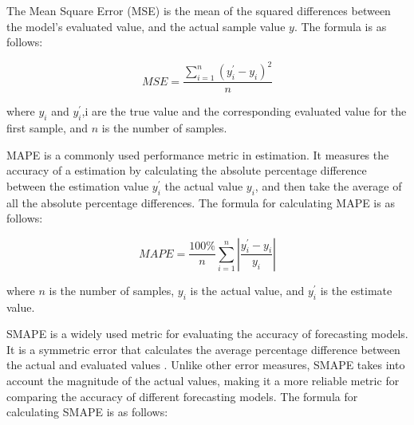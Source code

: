 \documentclass[acmsmall,manuscript, screen, review]{acmart}
\begin{document}
The Mean Square Error (MSE) is the mean of the squared differences between the model's evaluated value, and the actual sample value \begin{math}
  y
\end{math}. The formula is as follows:

\begin{equation}
  MSE=\frac{\sum_{i=1}^{n}\left(y_i^\prime-y_i\right)^2}{n} \label{mse}
\end{equation}

where \begin{math}
  y_i
\end{math} and \begin{math}
  y_i^\prime
\end{math},i are the true value and the corresponding evaluated value for the first sample, and \begin{math}
  n
\end{math} is the number of samples.

MAPE is a commonly used performance metric in estimation. It measures the accuracy of a estimation by calculating the absolute percentage difference between the estimation value \begin{math}
  y_i^\prime
\end{math} the actual value \begin{math}
  y_i
\end{math}, and then take the average of all the absolute percentage differences. The formula for calculating MAPE is as follows:

\begin{equation}
  MAPE=\frac{100\%}{n}\sum_{i=1}^{n}\left|\frac{y_i^\prime-y_i}{y_i}\right| \label{mape}
\end{equation}

where \begin{math}
  n
\end{math} is the number of samples, \begin{math}
  y_i
\end{math} is the actual value, and \begin{math}
  y_i^\prime
\end{math} is the estimate value.

SMAPE is a widely used metric for evaluating the accuracy of forecasting models. It is a symmetric error that calculates the average percentage difference between the actual and evaluated values . Unlike other error measures, SMAPE takes into account the magnitude of the actual values, making it a more reliable metric for comparing the accuracy of different forecasting models. The formula for calculating SMAPE is as follows:
\end{document}
